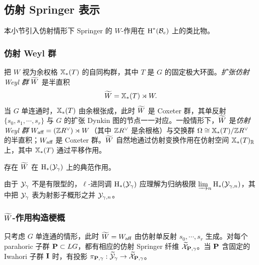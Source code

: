 \subsection{仿射 Springer 表示}
本小节引入仿射情形下 Springer 的 $W$-作用在 $\textup{H}^{*}({\mathcal{B}_{e}})$ 上的类比物。

\subsubsection{仿射 Weyl 群} 把 $W$ 视为余权格 $\mathbb{X}_*(T)$ 的自同构群，其中 $T$ 是 $G$ 的固定极大环面。{\em 扩张仿射 Weyl 群} $\widetilde{W}$ 是半直积
\begin{equation*}
\widetilde{W}=\mathbb{X}_*(T)\rtimes W.
\end{equation*}
当 $G$ 单连通时，$\mathbb{X}_*(T)$ 由余根张成，此时 $\widetilde{W}$ 是 Coxeter 群，其单反射 $\{s_{0},s_{1}, \cdots,s_{r}\}$ 与 $G$ 的扩张 Dynkin 图的节点一一对应。一般情形下，$\widetilde{W}$ 是{\em 仿射 Weyl 群} $W_{\textup{aff}}=(\mathbb{Z} R^{\vee})\rtimes W$（其中 $\mathbb{Z} R^{\vee}$ 是余根格）与交换群 $\Omega\cong \mathbb{X}_*(T)/\mathbb{Z} R^{\vee}$ 的半直积；$W_{\textup{aff}}$ 是 Coxeter 群。$\widetilde{W}$ 自然地通过仿射变换作用在仿射空间 $\mathbb{X}_*(T)_{\mathbb{R}}$ 上，其中 $\mathbb{X}_*(T)$ 通过平移作用。

\begin{theorem}\label{th:aff action} 存在 $\widetilde{W}$ 在 $\textup{H}_{*}({\mathcal{Y}_{\gamma}})$ 上的典范作用。
\end{theorem}

由于 $\mathcal{Y}_{\gamma}$ 不是有限型的，$\ell$-进同调 $\textup{H}_{*}({\mathcal{Y}_{\gamma}})$ 应理解为归纳极限 $\varinjlim_{n}\textup{H}_{*}({\mathcal{Y}_{\gamma,n}})$，其中把 $\mathcal{Y}_{\gamma}$ 表为射影子概形之并 $\mathcal{Y}_{\gamma,n}$。

\subsubsection{$\widetilde{W}$-作用构造梗概} 只考虑 $G$ 单连通的情形，此时 $\widetilde{W}=W_{\textup{aff}}$ 由仿射单反射 $s_{0}, \cdots, s_{r}$ 生成。对每个 parahoric 子群 $\mathbf{P}\subset LG$，都有相应的仿射 Springer 纤维 $\widetilde{\mathcal{X}}_{\mathbf{P},\gamma}$。当 $\mathbf{P}$ 含固定的 Iwahori 子群 $\mathbf{I}$ 时，有投影 $\pi_{\mathbf{P},\gamma}:\widetilde{\mathcal{Y}}_{\gamma}\to \widetilde{\mathcal{X}}_{\mathbf{P},\gamma}$。

